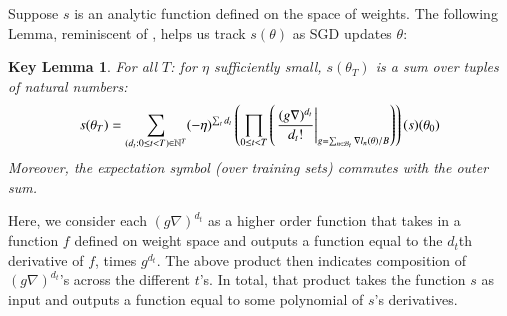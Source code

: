 \documentclass[anon,12pt]{colt2021} %
\newtheorem*{klem*}{Key Lemma}
\newcommand{\wrap}[1]{\left(#1\right)}
\newcommand{\Bb}{\mathcal{B}}
\begin{document}
        Suppose $s$ is an analytic function defined on the space of weights.
        The following Lemma, reminiscent of \cite{dy49a}, helps us track
        $s(\theta)$ as SGD updates $\theta$:
        \begin{klem*} \label{lem:dyson}
            For all $T$: for $\eta$ sufficiently small, $s(\theta_T)$ is a sum
            over tuples of natural numbers:
            \begin{equation}\label{eq:dyson2}
                s(\theta_T) = 
                \sum_{(d_t: 0\leq t<T) \in \NN^T}
                (-\eta)^{\sum_t d_t}
                \wrap{
                    \prod_{0 \leq t < T}
                        \wrap{\left.
                            \frac{(g \nabla)^{d_t}}{d_t!}
                        \right|_{g = \sum_{n\in \Bb_t} \nabla l_n(\theta) / B}}
                }(s) (\theta_0)
            \end{equation}
            Moreover, the expectation symbol (over training sets) commutes with
            the outer sum.
        \end{klem*}
        Here, we consider each $(g \nabla)^{d_t}$ as a higher order function
        that takes in a function $f$ defined on weight space and outputs a
        function equal to the $d_t$th derivative of $f$, times $g^{d_t}$.
        The above product then indicates composition of $(g \nabla)^{d_t}$'s
        across the different $t$'s.  In total, that product takes the function
        $s$ as input and outputs a function equal to some polynomial of $s$'s
        derivatives.
\end{document}
